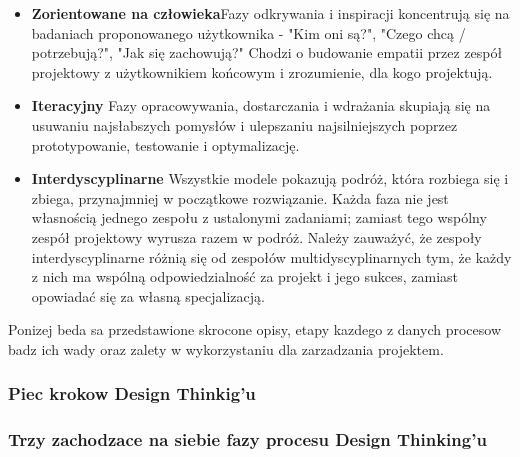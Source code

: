 \documentclass[a4paper,titleauthor]{mwart}
\begin{document}
 \begin{itemize}
	\item \textbf{Zorientowane na człowieka}\newline \newline Fazy odkrywania i inspiracji koncentrują się na badaniach proponowanego użytkownika - "Kim oni są?", "Czego chcą / potrzebują?", "Jak się zachowują?" Chodzi o budowanie empatii przez zespół projektowy z użytkownikiem końcowym i zrozumienie, dla kogo projektują.\newline
	\item \textbf{Iteracyjny} \newline \newline Fazy opracowywania, dostarczania i wdrażania skupiają się na usuwaniu najsłabszych pomysłów i ulepszaniu najsilniejszych poprzez prototypowanie, testowanie i optymalizację.\newline
	\item \textbf{Interdyscyplinarne} \newline \newline Wszystkie modele pokazują podróż, która rozbiega się i zbiega, przynajmniej w początkowe rozwiązanie. Każda faza nie jest własnością jednego zespołu z ustalonymi zadaniami; zamiast tego wspólny zespół projektowy wyrusza razem w podróż. Należy zauważyć, że zespoły interdyscyplinarne różnią się od zespołów multidyscyplinarnych tym, że każdy z nich ma wspólną odpowiedzialność za projekt i jego sukces, zamiast opowiadać się za własną specjalizacją.
 \end{itemize}

Ponizej beda sa przedstawione skrocone opisy, etapy kazdego z danych procesow badz ich wady oraz zalety w wykorzystaniu dla zarzadzania projektem.
 
 \subsubsection{Piec krokow Design Thinkig'u}


 \subsubsection{Trzy zachodzace na siebie fazy procesu Design Thinking'u}
 
\end{document}
